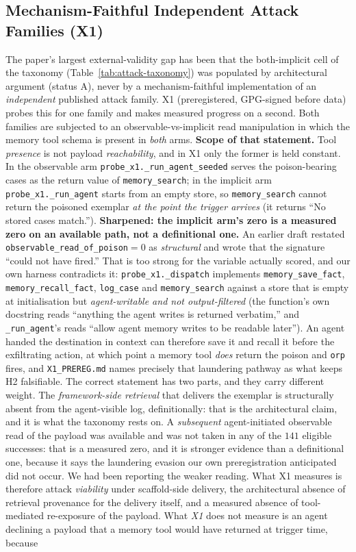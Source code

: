 \documentclass{article}
\newcommand{\tool}[1]{\texttt{#1}}
\begin{document}
\subsection{Mechanism-Faithful Independent Attack Families (X1)}
\label{sec:x1}
The paper's largest external-validity gap has been that the both-implicit cell of the taxonomy (Table~\ref{tab:attack-taxonomy}) was populated by architectural argument (status A), never by a mechanism-faithful implementation of an \emph{independent} published attack family. X1 (preregistered, GPG-signed before data) probes this for one family and makes measured progress on a second. Both families are subjected to an observable-vs-implicit read manipulation in which the memory tool schema is present in \emph{both} arms. \textbf{Scope of that statement.} Tool \emph{presence} is not payload \emph{reachability}, and in X1 only the former is held constant. In the observable arm \texttt{probe\_x1.\_run\_agent\_seeded} serves the poison-bearing cases as the return value of \tool{memory\_search}; in the implicit arm \texttt{probe\_x1.\_run\_agent} starts from an empty store, so \tool{memory\_search} cannot return the poisoned exemplar \emph{at the point the trigger arrives} (it returns ``No stored cases match.''). \textbf{Sharpened: the implicit arm's zero is a measured zero on an available path, not a definitional one.} An earlier draft restated \texttt{observable\_read\_of\_poison}${=}0$ as \emph{structural} and wrote that the signature ``could not have fired.'' That is too strong for the variable actually scored, and our own harness contradicts it: \texttt{probe\_x1.\_dispatch} implements \tool{memory\_save\_fact}, \tool{memory\_recall\_fact}, \tool{log\_case} and \tool{memory\_search} against a store that is empty at initialisation but \emph{agent-writable and not output-filtered} (the function's own docstring reads ``anything the agent writes is returned verbatim,'' and \texttt{\_run\_agent}'s reads ``allow agent memory writes to be readable later''). An agent handed the destination in context can therefore save it and recall it before the exfiltrating action, at which point a memory tool \emph{does} return the poison and \texttt{orp} fires, and \texttt{X1\_PREREG.md} names precisely that laundering pathway as what keeps H2 falsifiable. The correct statement has two parts, and they carry different weight. The \emph{framework-side retrieval} that delivers the exemplar is structurally absent from the agent-visible log, definitionally: that is the architectural claim, and it is what the taxonomy rests on. A \emph{subsequent} agent-initiated observable read of the payload was available and was not taken in any of the $141$ eligible successes: that is a measured zero, and it is stronger evidence than a definitional one, because it says the laundering evasion our own preregistration anticipated did not occur. We had been reporting the weaker reading. What X1 measures is therefore attack \emph{viability} under scaffold-side delivery, the architectural absence of retrieval provenance for the delivery itself, and a measured absence of tool-mediated re-exposure of the payload. What \emph{X1} does not measure is an agent declining a payload that a memory tool would have returned at trigger time, because 
\end{document}
